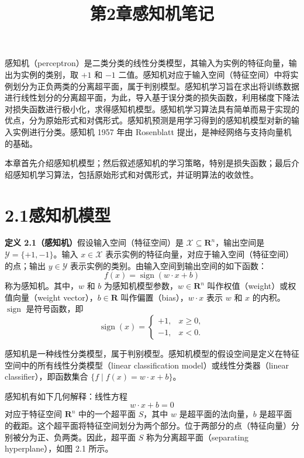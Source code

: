 \documentclass[UTF8,12pt,a4paper,fontset=fandol]{ctexart}
\title{第2章\quad 感知机笔记}
\author{}
\date{}
\begin{document}
\maketitle

感知机（perceptron）是二类分类的线性分类模型，其输入为实例的特征向量，输出为实例的类别，取 $+1$ 和 $-1$ 二值。感知机对应于输入空间（特征空间）中将实例划分为正负两类的分离超平面，属于判别模型。感知机学习旨在求出将训练数据进行线性划分的分离超平面，为此，导入基于误分类的损失函数，利用梯度下降法对损失函数进行极小化，求得感知机模型。感知机学习算法具有简单而易于实现的优点，分为原始形式和对偶形式。感知机预测是用学习得到的感知机模型对新的输入实例进行分类。感知机 1957 年由 Rosenblatt 提出，是神经网络与支持向量机的基础。

本章首先介绍感知机模型；然后叙述感知机的学习策略，特别是损失函数；最后介绍感知机学习算法，包括原始形式和对偶形式，并证明算法的收敛性。

\section*{2.1\quad 感知机模型}

\noindent\textbf{定义 2.1（感知机）}\quad 假设输入空间（特征空间）是 $\mathcal{X}\subseteq\mathbf{R}^n$，输出空间是 $\mathcal{Y}=\{+1,-1\}$。输入 $x\in\mathcal{X}$ 表示实例的特征向量，对应于输入空间（特征空间）的点；输出 $y\in\mathcal{Y}$ 表示实例的类别。由输入空间到输出空间的如下函数：
\begin{equation}
  f(x)=\operatorname{sign}(w\cdot x+b)
  \tag{2.1}
\end{equation}
称为感知机。其中，$w$ 和 $b$ 为感知机模型参数，$w\in\mathbf{R}^n$ 叫作权值（weight）或权值向量（weight vector），$b\in\mathbf{R}$ 叫作偏置（bias），$w\cdot x$ 表示 $w$ 和 $x$ 的内积。$\operatorname{sign}$ 是符号函数，即
\begin{equation}
  \operatorname{sign}(x)=
  \begin{cases}
    +1, & x\ge 0,\\
    -1, & x<0.
  \end{cases}
  \tag{2.2}
\end{equation}

感知机是一种线性分类模型，属于判别模型。感知机模型的假设空间是定义在特征空间中的所有线性分类模型（linear classification model）或线性分类器（linear classifier），即函数集合 $\{f\mid f(x)=w\cdot x+b\}$。

感知机有如下几何解释：线性方程
\begin{equation}
  w\cdot x+b=0
  \tag{2.3}
\end{equation}
对应于特征空间 $\mathbf{R}^n$ 中的一个超平面 $S$，其中 $w$ 是超平面的法向量，$b$ 是超平面的截距。这个超平面将特征空间划分为两个部分。位于两部分的点（特征向量）分别被分为正、负两类。因此，超平面 $S$ 称为分离超平面（separating hyperplane），如图 2.1 所示。
\end{document}
